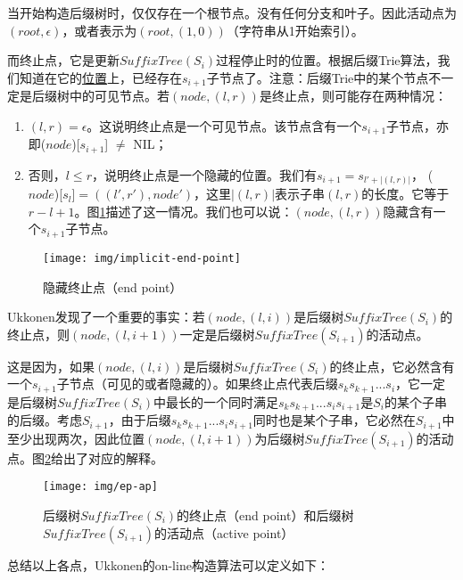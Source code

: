 \documentclass{ctexart}
\begin{document}
当开始构造后缀树时，仅仅存在一个根节点。没有任何分支和叶子。因此活动点为$(root, \epsilon)$，或者表示为$(root, (1, 0))$（字符串从1开始索引）。

而终止点，它是更新$SuffixTree(S_i)$过程停止时的位置。根据后缀Trie算法，我们知道在它的\underline{位置}上，已经存在$s_{i+1}$子节点了。注意：后缀Trie中的某个节点不一定是后缀树中的可见节点。若$(node, (l, r))$是终止点，则可能存在两种情况：

\begin{enumerate}
\item $(l, r)=\epsilon$。这说明终止点是一个可见节点。该节点含有一个$s_{i+1}$子节点，亦即($node$)[$s_{i+1}$] $\neq$ NIL；
\item 否则，$l \leq r$，说明终止点是一个隐藏的位置。我们有$s_{i+1}=s_{l'+|(l, r)|}$，
($node$)[$s_l$]$=((l', r'), node')$，这里$|(l, r)|$表示子串$(l, r)$的长度。它等于$r-l+1$。图\cref{fig:implicit-end-point}描述了这一情况。我们也可以说：$(node, (l, r))$隐藏含有一个$s_{i+1}$子节点。
\end{enumerate}

\begin{figure}[htbp]
  \centering
  \texttt{[image: img/implicit-end-point]}
  \caption{隐藏终止点（end point）}
  \label{fig:implicit-end-point}
\end{figure}

Ukkonen发现了一个重要的事实：若$(node, (l, i))$是后缀树$SuffixTree(S_i)$的终止点，则$(node, (l, i+1))$一定是后缀树$SuffixTree(S_{i+1})$的活动点。

这是因为，如果$(node, (l, i))$是后缀树$SuffixTree(S_i)$的终止点，它必然含有一个$s_{i+1}$子节点（可见的或者隐藏的）。如果终止点代表后缀$s_ks_{k+1}...s_i$，它一定是后缀树$SuffixTree(S_i)$中最长的一个同时满足$s_ks_{k+1}...s_is_{i+1}$是$S_i$的某个子串的后缀。考虑$S_{i+1}$，由于后缀$s_ks_{k+1}...s_is_{i+1}$同时也是某个子串，它必然在$S_{i+1}$中至少出现两次，因此位置$(node, (l, i+1))$为后缀树$SuffixTree(S_{i+1})$的活动点。图\cref{fig:ep-ap}给出了对应的解释。

\begin{figure}[htbp]
  \centering
  \texttt{[image: img/ep-ap]}
  \caption{后缀树$SuffixTree(S_i)$的终止点（end point）和后缀树$SuffixTree(S_{i+1})$的活动点（active point）}
  \label{fig:ep-ap}
\end{figure}

总结以上各点，Ukkonen的on-line构造算法可以定义如下：
\end{document}
